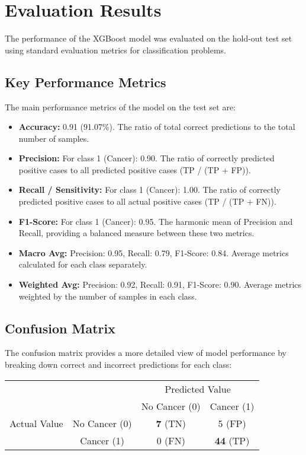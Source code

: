 \section{Evaluation Results}

The performance of the XGBoost model was evaluated on the hold-out test set using standard evaluation metrics for classification problems.

\subsection{Key Performance Metrics}

The main performance metrics of the model on the test set are:
\begin{itemize}
    \item \textbf{Accuracy:} 0.91 (91.07\%). The ratio of total correct predictions to the total number of samples.
    \item \textbf{Precision:} For class 1 (Cancer): 0.90. The ratio of correctly predicted positive cases to all predicted positive cases (TP / (TP + FP)).
    \item \textbf{Recall / Sensitivity:} For class 1 (Cancer): 1.00. The ratio of correctly predicted positive cases to all actual positive cases (TP / (TP + FN)).
    \item \textbf{F1-Score:} For class 1 (Cancer): 0.95. The harmonic mean of Precision and Recall, providing a balanced measure between these two metrics.
    \item \textbf{Macro Avg:} Precision: 0.95, Recall: 0.79, F1-Score: 0.84. Average metrics calculated for each class separately.
    \item \textbf{Weighted Avg:} Precision: 0.92, Recall: 0.91, F1-Score: 0.90. Average metrics weighted by the number of samples in each class.
\end{itemize}

\subsection{Confusion Matrix}

The confusion matrix provides a more detailed view of model performance by breaking down correct and incorrect predictions for each class:

\begin{center}
\begin{tabular}{cc|c|c|}
  & \multicolumn{1}{c}{} & \multicolumn{2}{c}{Predicted Value} \\
  & \multicolumn{1}{c}{} & \multicolumn{1}{c}{No Cancer (0)}  & \multicolumn{1}{c}{Cancer (1)} \\
  \cline{3-4}
Actual Value & No Cancer (0) & \textbf{7} (TN) & 5 (FP) \\
  \cline{3-4}
  & Cancer (1) & 0 (FN) & \textbf{44} (TP) \\
  \cline{3-4}
\end{tabular}
\end{center}

